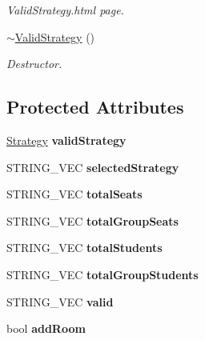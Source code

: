 \begin{DoxyCompactItemize}
\begin{DoxyCompactList}\small\item\em Valid\-Strategy.\-html page. \end{DoxyCompactList}\item 
\hypertarget{classValidStrategy_aec9e6ff1c9e9058a17f5488fe3e6cfec}{\hyperlink{classValidStrategy_aec9e6ff1c9e9058a17f5488fe3e6cfec}{$\sim$\-Valid\-Strategy} ()}\label{classValidStrategy_aec9e6ff1c9e9058a17f5488fe3e6cfec}

\begin{DoxyCompactList}\small\item\em Destructor. \end{DoxyCompactList}\end{DoxyCompactItemize}
\subsection*{Protected Attributes}
\begin{DoxyCompactItemize}
\item 
\hypertarget{classValidStrategy_aac23ca61c16d79b48603a7db96617003}{\hyperlink{classStrategy}{Strategy} {\bfseries valid\-Strategy}}\label{classValidStrategy_aac23ca61c16d79b48603a7db96617003}

\item 
\hypertarget{classValidStrategy_a0400bdc1d25df2a613d50ed02c537eb2}{S\-T\-R\-I\-N\-G\-\_\-\-V\-E\-C {\bfseries selected\-Strategy}}\label{classValidStrategy_a0400bdc1d25df2a613d50ed02c537eb2}

\item 
\hypertarget{classValidStrategy_ad34fa679672d7685af9678e6c579e800}{S\-T\-R\-I\-N\-G\-\_\-\-V\-E\-C {\bfseries total\-Seats}}\label{classValidStrategy_ad34fa679672d7685af9678e6c579e800}

\item 
\hypertarget{classValidStrategy_a7344a7cf32192fa494ed9dd6784c509e}{S\-T\-R\-I\-N\-G\-\_\-\-V\-E\-C {\bfseries total\-Group\-Seats}}\label{classValidStrategy_a7344a7cf32192fa494ed9dd6784c509e}

\item 
\hypertarget{classValidStrategy_a4d0e361e6ed28a83332bebf66ab018e2}{S\-T\-R\-I\-N\-G\-\_\-\-V\-E\-C {\bfseries total\-Students}}\label{classValidStrategy_a4d0e361e6ed28a83332bebf66ab018e2}

\item 
\hypertarget{classValidStrategy_a4d947570307ce9d87d35f699ee10cae6}{S\-T\-R\-I\-N\-G\-\_\-\-V\-E\-C {\bfseries total\-Group\-Students}}\label{classValidStrategy_a4d947570307ce9d87d35f699ee10cae6}

\item 
\hypertarget{classValidStrategy_a66d7ba02a423a08f4f0af7c714787e76}{S\-T\-R\-I\-N\-G\-\_\-\-V\-E\-C {\bfseries valid}}\label{classValidStrategy_a66d7ba02a423a08f4f0af7c714787e76}

\item 
\hypertarget{classValidStrategy_aa18f4ff7dd65ed5702148c192f8627a6}{bool {\bfseries add\-Room}}\label{classValidStrategy_aa18f4ff7dd65ed5702148c192f8627a6}

\end{DoxyCompactItemize}
